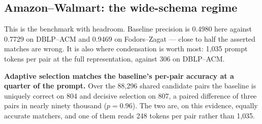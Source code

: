 \documentclass[11pt]{article}
\begin{document}
\subsection{Amazon--Walmart: the wide-schema regime}
\label{sec:amazon}

\begin{table}[h]
\centering
{}
\caption{Amazon--Walmart, 1{,}143 ground-truth matches, blocking completeness 0.9143.
Metrics are end-to-end, so false negatives include the 98 matches blocking did not retain.
All Step-1.5 rows use the evidence mask of Section~\ref{sec:mask}. The \texttt{cumulative}
row runs with the attribute cap removed, without which the rule cannot reach its target on
this schema at all.}
\end{table}

This is the benchmark with headroom. Baseline precision is 0.4980 here against 0.7729 on
DBLP--ACM and 0.9469 on Fodors--Zagat --- close to half the asserted matches are wrong. It
is also where condensation is worth most: 1{,}035 prompt tokens per pair at the full
representation, against 306 on DBLP--ACM.

\textbf{Adaptive selection matches the baseline's per-pair accuracy at a quarter of the
prompt.} Over the 88{,}296 shared candidate pairs the baseline is uniquely correct on 804
and decisive selection on 807, a paired difference of three pairs in nearly ninety thousand
($p = 0.96$). The two are, on this evidence, equally accurate matchers, and one of them
reads 248 tokens per pair rather than 1{,}035.
\end{document}

